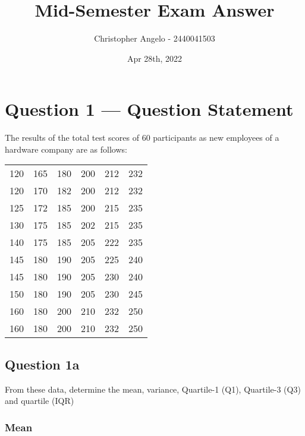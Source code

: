 \documentclass[
  11pt, %
]{assignment}
\author{Christopher Angelo - 2440041503}
\institute{BINUS University\\ Global Class}
\date{Apr 28th, 2022}
\title{Mid-Semester Exam Answer}
\begin{document}
\maketitle


\section*{Question 1 --- Question Statement}
\begin{problem}
The results of the total test scores of 60 participants as new employees of a hardware company are as follows:
\medskip

\begin{center}
  \begin{tabular}{| c c c c c c |}
    \toprule
    120 & 165 & 180 & 200 & 212 & 232 \\
    120 & 170 & 182 & 200 & 212 & 232 \\
    125 & 172 & 185 & 200 & 215 & 235 \\
    130 & 175 & 185 & 202 & 215 & 235 \\
    140 & 175 & 185 & 205 & 222 & 235 \\
    145 & 180 & 190 & 205 & 225 & 240 \\
    145 & 180 & 190 & 205 & 230 & 240 \\
    150 & 180 & 190 & 205 & 230 & 245 \\
    160 & 180 & 200 & 210 & 232 & 250 \\
    160 & 180 & 200 & 210 & 232 & 250 \\
    \bottomrule
  \end{tabular}
\end{center}
\end{problem}

\subsection*{Question 1a}

\begin{problem}
From these data, determine the mean, variance, Quartile-1 (Q1), Quartile-3 (Q3) and quartile (IQR)
\end{problem}

\subsubsection*{Mean}
\end{document}

